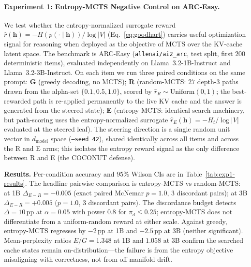 \documentclass{article}
\begin{document}
\paragraph{Experiment 1: Entropy-MCTS Negative Control on ARC-Easy.}\label{sec:exp1}
We test whether the entropy-normalized surrogate reward $\hat{r}(\mathbf{h}) = -H(p(\cdot \mid \mathbf{h}))/\log|V|$ (Eq.~\ref{eq:goodhart}) carries useful optimization signal for reasoning when deployed as the objective of MCTS over the KV-cache latent space. The benchmark is ARC-Easy (\texttt{allenai/ai2\_arc}, test split, first $200$ deterministic items), evaluated independently on Llama~3.2-1B-Instruct and Llama~3.2-3B-Instruct. On each item we run three paired conditions on the same prompt: \textbf{G} (greedy decoding, no MCTS); \textbf{R} (random-MCTS: $27$ depth-$3$ paths drawn from the alpha-set $\{0.1, 0.5, 1.0\}$, scored by $\hat{r}_R \sim \mathrm{Uniform}(0, 1)$; the best-rewarded path is re-applied permanently to the live KV cache and the answer is generated from the steered state); \textbf{E} (entropy-MCTS: identical search machinery, but path-scoring uses the entropy-normalized surrogate $\hat{r}_E(\mathbf{h}) = -H_t/\log|V|$ evaluated at the steered leaf). The steering direction is a single random unit vector in $d_{\text{model}}$ space (\texttt{--seed 42}), shared identically across all items and across the R and E arms; this isolates the entropy reward signal as the only difference between R and E (the COCONUT defense).

\textbf{Results.} Per-condition accuracy and 95\% Wilson CIs are in Table~\ref{tab:exp1-results}. The headline pairwise comparison is entropy-MCTS vs random-MCTS: at 1B $\Delta_{E-R} = -0.005$ (exact paired McNemar $p = 1.0$, 3 discordant pairs); at 3B $\Delta_{E-R} = +0.005$ ($p = 1.0$, 3 discordant pairs). The discordance budget detects $\Delta = 10$\,pp at $\alpha = 0.05$ with power $0.8$ for $\pi_d \le 0.25$; entropy-MCTS does not differentiate from a uniform-random reward at either scale. Against greedy, entropy-MCTS regresses by $-2$\,pp at 1B and $-2.5$\,pp at 3B (neither significant). Mean-perplexity ratios $E/G = 1.348$ at 1B and $1.058$ at 3B confirm the searched cache states remain on-distribution---the failure is from the entropy objective misaligning with correctness, not from off-manifold drift.
\end{document}
